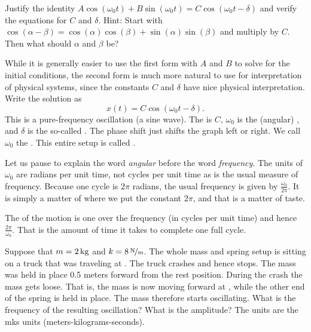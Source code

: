 \begin{exercise}
Justify the identity $A \cos (\omega_0 t) + B \sin (\omega_0 t) =
C \cos ( \omega_0 t - \delta )$ and verify the equations for $C$
and $\delta$.  Hint: Start with
$\cos (\alpha-\beta) = \cos (\alpha) \cos
(\beta) + \sin (\alpha)\sin (\beta)$ and multiply by $C$.  Then what should
$\alpha$ and $\beta$ be?
\end{exercise}

While it is generally easier to use the first form with $A$ and $B$
to solve for the initial conditions, the second form is much
more natural to use for interpretation of physical systems, since the constants $C$ and $\delta$ have nice physical interpretation.
Write the solution as
\begin{equation*}
x(t) = C \cos ( \omega_0 t - \delta) .
\end{equation*}
This is a pure-frequency oscillation (a sine wave).
The \emph{} is $C$, $\omega_0$ is the (angular)
\emph{},
and $\delta$ is the so-called \emph{}.
The phase shift just shifts the
graph left or right.
We call $\omega_0$ the \emph{}.
This entire setup is 
called \emph{}.

Let us pause to explain the word \emph{angular}
before the word \emph{frequency}.
The units of
$\omega_0$ are radians per unit time, not cycles per unit time 
as is the usual measure of frequency.  Because one cycle is $2
\pi$ radians, the usual frequency is given by $\frac{\omega_0}{2\pi}$.
It is simply a matter of where we put the constant $2\pi$, and that is a
matter of taste.

The \emph{} of the motion is one over the frequency (in cycles per unit
time) and hence $\frac{2\pi}{\omega_0}$.  That is the amount of time it takes
to complete one full cycle.


\begin{example}
Suppose that $m=\unit[2]{kg}$ and $k=\unitfrac[8]{N}{m}$.
The whole mass and spring setup is sitting on
a truck that was traveling at .
The truck crashes and hence stops.
The mass was held in place 0.5 meters forward from the rest position.  During
the crash the mass gets loose.  That is, the mass is now 
moving forward at , while the other end of the
spring is held
in place.  The mass therefore starts oscillating.
What is the frequency of the resulting oscillation?  What is the amplitude?
The units are the mks units (meters-kilograms-seconds).
\end{example}

